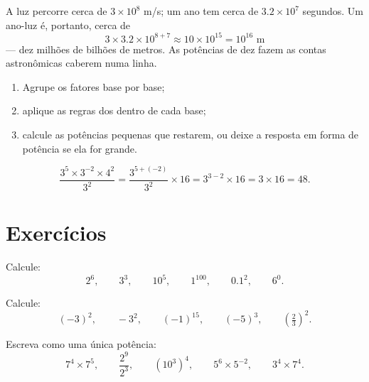 \begin{example}\label{ex:g8:powers:magnitude}
A luz percorre cerca de $3 \times 10^8$ m/s; um ano tem cerca de
$3.2 \times 10^7$ segundos. Um ano-luz é, portanto, cerca de
\[
3 \times 3.2 \times 10^{8+7} \approx 10 \times 10^{15} = 10^{16}
\text{ m}
\]
--- dez milhões de bilhões de metros. As potências de dez fazem as
contas astronômicas caberem numa linha.
\end{example}

\begin{method}\label{met:g8:powers:simplify}
\begin{enumerate}
  \item Agrupe os fatores base por base;
  \item aplique as regras dos  dentro de cada base;
  \item calcule as potências pequenas que restarem, ou deixe a resposta
        em forma de potência se ela for grande.
\end{enumerate}
\end{method}

\begin{example}\label{ex:g8:powers:simplify}
\[
\frac{3^5 \times 3^{-2} \times 4^2}{3^2}
= \frac{3^{5 + (-2)}}{3^2} \times 16
= 3^{3 - 2} \times 16
= 3 \times 16 = 48 .
\]
\end{example}

\section{Exercícios}

\begin{exercise}[$\star$]\label{exo:g8:powers:1}
Calcule:
\[
2^6, \qquad 3^3, \qquad 10^5, \qquad 1^{100}, \qquad 0.1^2, \qquad
6^0 .
\]
\end{exercise}

\begin{exercise}[$\star$]\label{exo:g8:powers:2}
Calcule:
\[
(-3)^2, \qquad -3^2, \qquad (-1)^{15}, \qquad (-5)^3, \qquad
\left(\tfrac{2}{3}\right)^2 .
\]
\end{exercise}

\begin{exercise}[$\star$]\label{exo:g8:powers:3}
Escreva como uma única potência:
\[
7^4 \times 7^5, \qquad
\frac{2^9}{2^3}, \qquad
\left(10^3\right)^4, \qquad
5^6 \times 5^{-2}, \qquad
3^4 \times 7^4 .
\]
\end{exercise}

